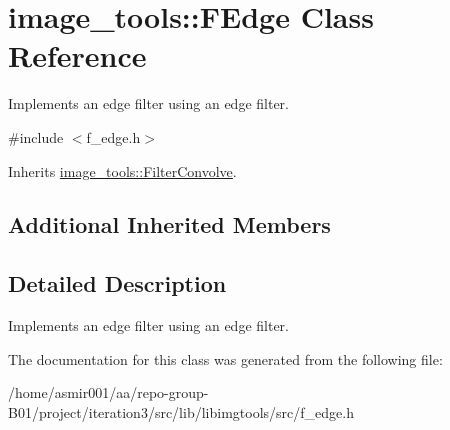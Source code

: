 \hypertarget{classimage__tools_1_1FEdge}{}\section{image\+\_\+tools\+:\+:F\+Edge Class Reference}
\label{classimage__tools_1_1FEdge}


Implements an edge filter using an edge filter.  




{\ttfamily \#include $<$f\+\_\+edge.\+h$>$}



Inherits \hyperlink{classimage__tools_1_1FilterConvolve}{image\+\_\+tools\+::\+Filter\+Convolve}.

\subsection*{Additional Inherited Members}


\subsection{Detailed Description}
Implements an edge filter using an edge filter. 

The documentation for this class was generated from the following file\+:\begin{DoxyCompactItemize}
\item 
/home/asmir001/aa/repo-\/group-\/\+B01/project/iteration3/src/lib/libimgtools/src/f\+\_\+edge.\+h\end{DoxyCompactItemize}

